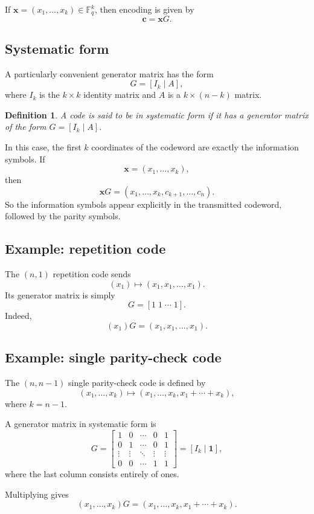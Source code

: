 \documentclass[11pt]{article}
\newtheorem{definition}{Definition}[section]
\newcommand{\F}{\mathbb{F}}
\newcommand{\vect}[1]{\bm{#1}}
\begin{document}
If \(\vect{x}=(x_1,\dots,x_k)\in \F_q^k\), then encoding is given by
\[
\vect{c}=\vect{x}G.
\]

\subsection{Systematic form}

A particularly convenient generator matrix has the form
\[
G=[I_k\mid A],
\]
where \(I_k\) is the \(k\times k\) identity matrix and \(A\) is a \(k\times (n-k)\) matrix.

\begin{definition}
A code is said to be in \emph{systematic form} if it has a generator matrix of the form \(G=[I_k\mid A]\).
\end{definition}

In this case, the first \(k\) coordinates of the codeword are exactly the information symbols. If
\[
\vect{x}=(x_1,\dots,x_k),
\]
then
\[
\vect{x}G=(x_1,\dots,x_k,c_{k+1},\dots,c_n).
\]
So the information symbols appear explicitly in the transmitted codeword, followed by the parity symbols.

\subsection{Example: repetition code}

The \((n,1)\) repetition code sends
\[
(x_1)\longmapsto (x_1,x_1,\dots,x_1).
\]
Its generator matrix is simply
\[
G=[1\;1\;\cdots\;1].
\]
Indeed,
\[
(x_1)G=(x_1,x_1,\dots,x_1).
\]

\subsection{Example: single parity-check code}

The \((n,n-1)\) single parity-check code is defined by
\[
(x_1,\dots,x_k)\longmapsto (x_1,\dots,x_k, x_1+\cdots+x_k),
\]
where \(k=n-1\).

A generator matrix in systematic form is
\[
G=
\begin{bmatrix}
1 & 0 & \cdots & 0 & 1 \\
0 & 1 & \cdots & 0 & 1 \\
\vdots & \vdots & \ddots & \vdots & \vdots \\
0 & 0 & \cdots & 1 & 1
\end{bmatrix}
=[I_k\mid \vect{1}],
\]
where the last column consists entirely of ones.

Multiplying gives
\[
(x_1,\dots,x_k)G=(x_1,\dots,x_k,x_1+\cdots+x_k).
\]
\end{document}
